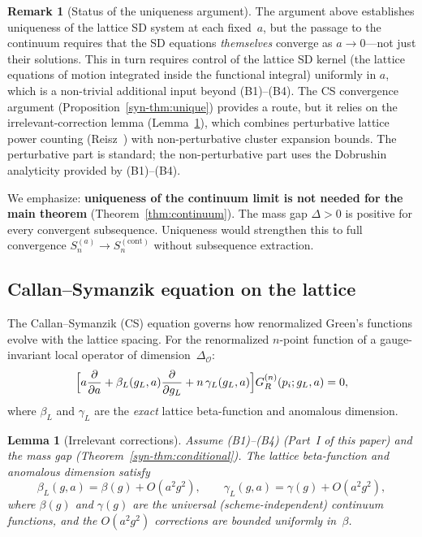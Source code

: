 \documentclass[11pt]{article}
\newtheorem{lemma}[theorem]{Lemma}
\theoremstyle{definition}
\newtheorem{remark}[theorem]{Remark}
\begin{document}
\begin{remark}[Status of the uniqueness argument]%
\label{rem:uniqueness-status}
The argument above establishes uniqueness of the lattice
SD system at each fixed~$a$, but the passage to the
continuum requires that the SD equations \emph{themselves}
converge as $a\to 0$---not just their solutions.
This in turn requires control of the lattice SD kernel
(the lattice equations of motion integrated inside the
functional integral) uniformly in $a$, which is a
non-trivial additional input beyond (B1)--(B4).
The CS convergence argument
(Proposition~\ref{syn-thm:unique}) provides a route,
but it relies on the irrelevant-correction lemma
(Lemma~\ref{syn-lem:irrelevant}), which combines
perturbative lattice power counting
(Reisz~\cite{Reisz1988,Reisz89}) with non-perturbative
cluster expansion bounds.  The perturbative part is
standard; the non-perturbative part uses the
Dobrushin analyticity provided by (B1)--(B4).

We emphasize: \textbf{uniqueness of the continuum limit
is not needed for the main theorem}
(Theorem~\ref{thm:continuum}).  The mass gap
$\Delta>0$ is positive for every convergent subsequence.
Uniqueness would strengthen this to full convergence
$S_n^{(a)}\to S_n^{(\mathrm{cont})}$ without subsequence
extraction.
\end{remark}

\subsection{Callan--Symanzik equation on the lattice}

The Callan--Symanzik (CS) equation governs how renormalized
Green's functions evolve with the lattice spacing.  For the
renormalized $n$-point function of a gauge-invariant local
operator of dimension~$\Delta_{\mathcal{O}}$:
\begin{equation}\label{syn-eq:cs_lattice}
  \Bigl[a\frac{\partial}{\partial a}
  + \beta_L(g_L, a)\frac{\partial}{\partial g_L}
  + n\,\gamma_L(g_L, a)\Bigr]
  G_R^{(n)}(p_i; g_L, a) = 0,
\end{equation}
where $\beta_L$ and $\gamma_L$ are the \emph{exact} lattice
beta-function and anomalous dimension.

\begin{lemma}[Irrelevant corrections]\label{syn-lem:irrelevant}
Assume (B1)--(B4) (Part~I of this paper) and the mass gap
\textup{(}Theorem~\ref{syn-thm:conditional}\textup{)}.
The lattice beta-function and anomalous dimension satisfy
\begin{equation}\label{syn-eq:irrelevant}
  \beta_L(g, a) = \beta(g) + O(a^2 g^2),
  \qquad
  \gamma_L(g, a) = \gamma(g) + O(a^2 g^2),
\end{equation}
where $\beta(g)$ and $\gamma(g)$ are the universal
\textup{(}scheme-independent\textup{)} continuum functions,
and the $O(a^2 g^2)$ corrections are bounded uniformly
in~$\beta$.
\end{lemma}
\end{document}
